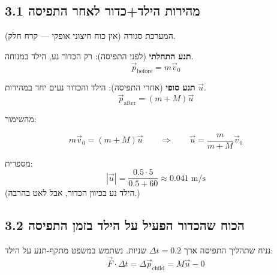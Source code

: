 \documentclass[12pt, a4paper]{article}
\newcommand{\hvec}[1]{\overrightarrow{#1}}
\newcommand{\childStanding}[3]{%
  \begin{scope}[shift={(#1, #2)}, scale=#3, line width=0.8pt]
    \draw[fill=orange!25] (0, 1.6) circle (0.22);                %
    \fill (-0.08, 1.66) circle (0.022);                          %
    \fill ( 0.08, 1.66) circle (0.022);                          %
    \draw (-0.08, 1.52) .. controls (0, 1.48) .. (0.08, 1.52);   %
    \draw (0, 1.38) -- (0, 0.55);                                %
    \draw (0, 1.20) -- (-0.28, 0.80);                            %
    \draw (0, 1.20) -- ( 0.28, 0.80);                            %
    \draw (0, 0.55) -- (-0.20, 0);                               %
    \draw (0, 0.55) -- ( 0.20, 0);                               %
  \end{scope}
}
\begin{document}
\begin{center}
\end{center}

\subsection*{3.1 מהירות הילד+כדור לאחר התפיסה}

המערכת סגורה (אין כוח חיצוני אופקי --- קרח חלק).

\textbf{תנע התחלתי} (לפני התפיסה): רק הכדור נע, הילד במנוחה.
\[
  \hvec{p}_{\text{before}} = m\hvec{v}_0
\]

\textbf{תנע סופי} (אחרי התפיסה): הילד והכדור נעים יחד במהירות \textenglish{$\hvec{u}$}.
\[
  \hvec{p}_{\text{after}} = (m + M)\hvec{u}
\]

מהשימור:

\begin{tcolorbox}[resultbox]
\[
  m\hvec{v}_0 = (m + M)\hvec{u}
  \qquad\Longrightarrow\qquad
  \hvec{u} = \frac{m}{m + M}\hvec{v}_0
\]
\end{tcolorbox}

מספרית:
\[
  |\hvec{u}| = \frac{0.5 \cdot 5}{0.5 + 60} \approx 0.041\;\text{m/s}
\]
(הילד נע בכיוון הכדור, אבל לאט בהרבה.)

\subsection*{3.2 הכוח שהכדור הפעיל על הילד בזמן התפיסה}

נניח שתהליך התפיסה ארך \textenglish{$\Delta t = 0.2$} שניות. נשתמש במשפט מתקף-תנע על הילד:
\[
  \hvec{F} \cdot \Delta t = \Delta\hvec{p}_{\text{child}} = M\hvec{u} - 0
\]
\end{document}
